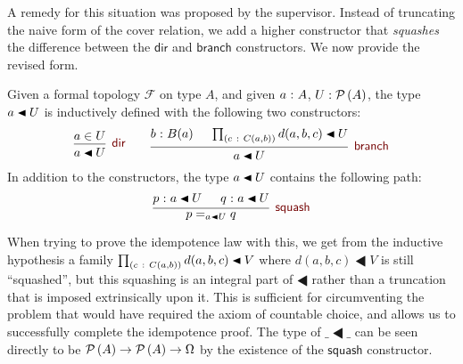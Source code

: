 A remedy for this situation was proposed by the supervisor. Instead of truncating the
naive form of the cover relation, we add a higher constructor that \emph{squashes} the
difference between the $\mathsf{dir}$ and $\mathsf{branch}$ constructors. We now provide
the revised form.
\begin{defn}\label{defn:covering}
  Given a formal topology
  $\mathcal{F}$ on type $A$, and given $a\hspace{0.1mm}:\hspace{0.1mm}A$, $U : \mathcal{P}\left(A\right)$, the type
  $\covers{a}{U}$ is inductively defined with the following two constructors:
  \[
  \begin{prooftree}
    \hypo{ a \in U }
    \infer1[$\ruledir{}$]{\covers{a}{U}}
  \end{prooftree}
  \qquad
  \begin{prooftree}
    \hypo{\oftyI{b}{B(a)}}
    \hypo{\pity{c}{C(a, b)}{\covers{d(a, b, c)}{U}}}
    \infer2[$\rulebranch{}$]{\covers{a}{U}}
  \end{prooftree}
  \]
  In addition to the constructors, the type $\covers{a}{U}$ contains the following path:
  \begin{equation*}
    \begin{prooftree}
      \hypo{\oftyI{p}{\covers{a}{U}}}
      \hypo{\oftyI{q}{\covers{a}{U}}}
      \infer2[$\rulesquash{}$]{p =_{\covers{a}{U}} q}
    \end{prooftree}
  \end{equation*}
\end{defn}

When trying to prove the idempotence law with this, we get from the inductive hypothesis a
family $\pity{c}{C(a, b)}{d(a, b, c) \LHD V}$ where $d(a, b, c) \LHD V$ is still
``squashed'', but this squashing is an integral part of $\LHD$ rather than a truncation
that is imposed extrinsically upon it. This is sufficient for circumventing the problem
that would have required the axiom of countable choice, and allows us to successfully
complete the idempotence proof. The type of $\_\LHD\_$ can be seen directly to be
$\mathcal{P}\left(A\right) \rightarrow \mathcal{P}\left(A\right) \rightarrow \Omega$ by the existence of the $\mathsf{squash}$ constructor.

